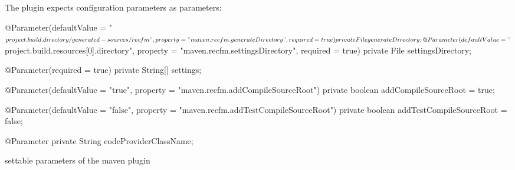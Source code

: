 \documentclass[a4paper,10pt]{report}
\newenvironment{elisting}[1][H]
  {\captionsetup{aboveskip=0pt}\begin{listing}[#1]}
  {\end{listing}%
}
\begin{document}
The plugin expects configuration parameters as parameters:
\begin{elisting}[!htb]
\begin{javacode}
    @Parameter(defaultValue = "${project.build.directory}/generated-sources/recfm",
        property = "maven.recfm.generateDirectory", required = true)
    private File generateDirectory;

    @Parameter(defaultValue = "${project.build.resources[0].directory}",
        property = "maven.recfm.settingsDirectory", required = true)
    private File settingsDirectory;
    
    @Parameter(required = true)
    private String[] settings;

    @Parameter(defaultValue = "true", property = "maven.recfm.addCompileSourceRoot")
    private boolean addCompileSourceRoot = true;

    @Parameter(defaultValue = "false", property = "maven.recfm.addTestCompileSourceRoot")
    private boolean addTestCompileSourceRoot = false;
    
    @Parameter
    private String codeProviderClassName;
\end{javacode}
\caption{settable parameters of the maven plugin}
\label{lst:maven.conf}
\end{elisting}
\end{document}
